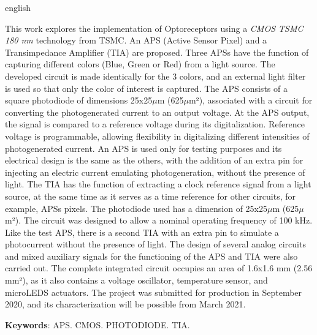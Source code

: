 
\begin{resumo}[Abstract]
 \begin{otherlanguage*}{english}

This work explores the implementation of Optoreceptors using a \textit{CMOS TSMC 180 nm} technology from TSMC. An APS (Active Sensor Pixel) and a Transimpedance Amplifier (TIA) are proposed. Three APSs have the function of capturing different colors (Blue, Green or Red) from a light source. The developed circuit is made identically for the 3 colors, and an external light filter is used so that only the color of interest is captured. The APS consists of a square photodiode of dimensions 25x25$\mu$m (625$\mu$m²), associated with a circuit for converting the photogenerated current to an output voltage. At the APS output, the signal is compared to a reference voltage during its digitalization. Reference voltage is programmable, allowing flexibility in digitalizing different intensities of photogenerated current. An APS is used only for testing purposes and its electrical design is the same as the others, with the addition of an extra pin for injecting an electric current emulating photogeneration, without the presence of light. The TIA has the function of extracting a clock reference signal from a light source, at the same time as it serves as a time reference for other circuits, for example, APSs pixels. The photodiode used has a dimension of 25x25$\mu$m (625$\mu$m²). The circuit was designed to allow a nominal operating frequency of 100 kHz. Like the test APS, there is a second TIA with an extra pin to simulate a photocurrent without the presence of light. The design of several analog circuits and mixed auxiliary signals for the functioning of the APS and TIA were also carried out. The complete integrated circuit occupies an area of 1.6x1.6 mm (2.56 mm²), as it also contains a voltage oscillator, temperature sensor, and microLEDS actuators. The project was submitted for production in September 2020, and its characterization will be possible from March 2021.

   \vspace{\onelineskip}
 
   \noindent 
   \textbf{Keywords}: APS. CMOS. PHOTODIODE. TIA.
 \end{otherlanguage*}
\end{resumo}